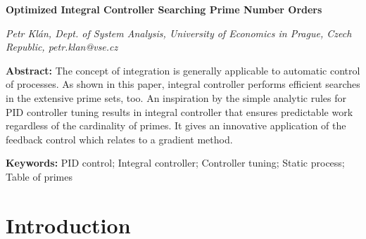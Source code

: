 \documentclass[12pt,a4paper,twoside]{article}
\begin{document}
\begin{center}
{\LARGE\bf Optimized Integral Controller Searching Prime Number Orders}
\end{center}

\vspace{0.1cm}
\begin{center}
{\it Petr Kl\'{a}n, Dept. of System Analysis, University of Economics in Prague, Czech Republic, petr.klan@vse.cz}
\end{center}

\vspace{0.7cm}
\noindent
{\bf Abstract:} The concept of integration is generally applicable to automatic control of processes. As shown in this paper, integral controller performs efficient searches in the extensive prime sets, too. An inspiration by the simple analytic rules for PID controller tuning results in integral controller that ensures predictable work regardless of the cardinality of primes. It gives an innovative application of the feedback control which relates to a gradient method. 

\vspace{1cm}
\noindent
{\bf Keywords:} PID control; Integral controller; Controller tuning; Static process; Table of primes


\section{Introduction}
\end{document}
